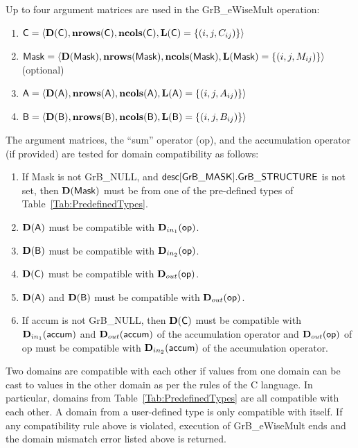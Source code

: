Up to four argument matrices are used in the {\sf GrB\_eWiseMult} operation:
\begin{enumerate}
	\item ${\sf C} = \langle \bold{D}({\sf C}),\bold{nrows}({\sf C}),\bold{ncols}({\sf C}),\bold{L}({\sf C}) = \{(i,j,C_{ij}) \} \rangle$
	\item ${\sf Mask} = \langle \bold{D}({\sf Mask}),\bold{nrows}({\sf Mask}),\bold{ncols}({\sf Mask}),\bold{L}({\sf Mask}) = \{(i,j,M_{ij}) \} \rangle$ (optional)
	\item ${\sf A} = \langle \bold{D}({\sf A}),\bold{nrows}({\sf A}), \bold{ncols}({\sf A}),\bold{L}({\sf A}) = \{(i,j,A_{ij}) \} \rangle$
	\item ${\sf B} = \langle \bold{D}({\sf B}),\bold{nrows}({\sf B}), \bold{ncols}({\sf B}),\bold{L}({\sf B}) = \{(i,j,B_{ij}) \} \rangle$
\end{enumerate}

The argument matrices, the ``sum'' operator ({\sf op}), and the accumulation 
operator (if provided) are tested for domain compatibility as follows:
\begin{enumerate}
	\item If {\sf Mask} is not {\sf GrB\_NULL}, and ${\sf desc[GrB\_MASK].GrB\_STRUCTURE}$
    is not set, then $\bold{D}({\sf Mask})$ must be from one of the pre-defined types of 
    Table~\ref{Tab:PredefinedTypes}.

	\item $\bold{D}({\sf A})$ must be compatible with $\mbox{$\mathbf{D}_{in_{1}}$}({\sf op})$.

	\item $\bold{D}({\sf B})$ must be compatible with $\mbox{$\mathbf{D}_{in_{2}}$}({\sf op})$.

	\item $\bold{D}({\sf C})$ must be compatible with $\mbox{$\mathbf{D}_{out}$}({\sf op})$.

	\item $\bold{D}({\sf A})$ and $\bold{D}({\sf B})$ must be compatible with $\mbox{$\mathbf{D}_{out}$}({\sf op})$.

	\item If {\sf accum} is not {\sf GrB\_NULL}, then $\bold{D}({\sf C})$ must be
    compatible with $\mbox{$\mathbf{D}_{in_{1}}$}({\sf accum})$ and $\mbox{$\mathbf{D}_{out}$}({\sf accum})$ of the accumulation operator and 
    $\mbox{$\mathbf{D}_{out}$}({\sf op})$ of {\sf op} must be compatible with $\mbox{$\mathbf{D}_{in_{2}}$}({\sf accum})$ of the accumulation operator.
\end{enumerate}
Two domains are compatible with each other if values from one domain can be cast 
to values in the other domain as per the rules of the C language.
In particular, domains from Table~\ref{Tab:PredefinedTypes} are all compatible 
with each other. A domain from a user-defined type is only compatible with itself.
If any compatibility rule above is violated, execution of {\sf GrB\_eWiseMult} ends and 
the domain mismatch error listed above is returned.

